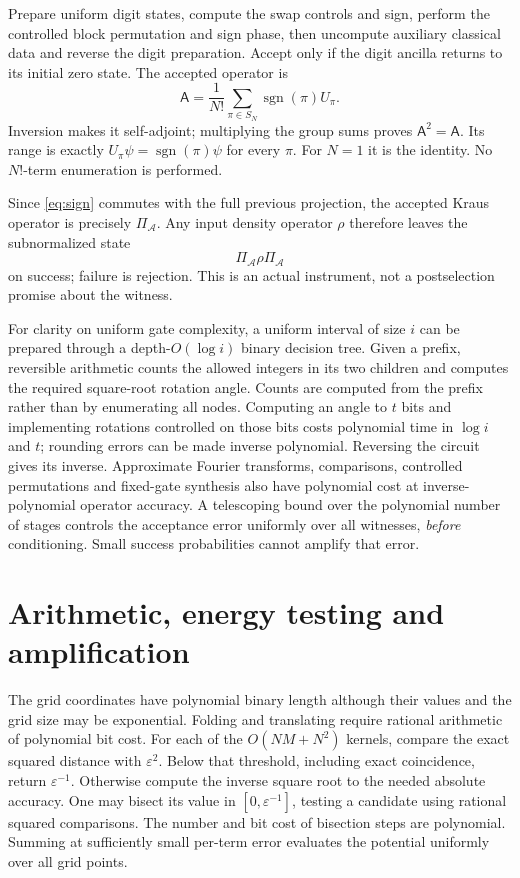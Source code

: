 \documentclass[11pt]{article}
\theoremstyle{remark}\newtheorem{remark}[theorem]{Remark}
\numberwithin{equation}{section}
\begin{document}
Prepare uniform digit states, compute the swap controls and sign, perform
the controlled block permutation and sign phase, then uncompute auxiliary
classical data and reverse the digit preparation. Accept only if the digit
ancilla returns to its initial zero state. The accepted operator is
\begin{equation}\label{eq:sign}
 \mathsf A=\frac1{N!}\sum_{\pi\in S_N}\operatorname{sgn}(\pi)U_\pi.
\end{equation}
Inversion makes it self-adjoint; multiplying the group sums proves
$\mathsf A^2=\mathsf A$. Its range is exactly
$U_\pi\psi=\operatorname{sgn}(\pi)\psi$ for every $\pi$.
For $N=1$ it is the identity. No $N!$-term enumeration is performed.

Since \eqref{eq:sign} commutes with the full previous projection, the
accepted Kraus operator is precisely $\Pi_{\mathcal A}$. Any input density
operator $\rho$ therefore leaves the subnormalized state
\begin{equation}\label{eq:subnorm}
 \Pi_{\mathcal A}\rho\Pi_{\mathcal A}
\end{equation}
on success; failure is rejection. This is an actual instrument, not a
postselection promise about the witness.

For clarity on uniform gate complexity, a uniform interval of size $i$
can be prepared through a depth-$O(\log i)$ binary decision tree. Given a
prefix, reversible arithmetic counts the allowed integers in its two
children and computes the required square-root rotation angle. Counts are
computed from the prefix rather than by enumerating all nodes. Computing
an angle to $t$ bits and implementing rotations controlled on those bits
costs polynomial time in $\log i$ and $t$; rounding errors can be made
inverse polynomial. Reversing the circuit gives its inverse.
Approximate Fourier transforms, comparisons, controlled permutations and
fixed-gate synthesis also have polynomial cost at inverse-polynomial
operator accuracy. A telescoping bound over the polynomial number of
stages controls the acceptance error uniformly over all witnesses,
\emph{before} conditioning. Small success probabilities cannot amplify
that error.

\section{Arithmetic, energy testing and amplification}
\label{sec:verification}
The grid coordinates have polynomial binary length although their values
and the grid size may be exponential. Folding and translating require
rational arithmetic of polynomial bit cost. For each of the
$O(NM+N^2)$ kernels, compare the exact squared distance with
$\varepsilon^2$. Below that threshold, including exact coincidence, return
$\varepsilon^{-1}$. Otherwise compute the inverse square root to the
needed absolute accuracy. One may bisect its value in
$[0,\varepsilon^{-1}]$, testing a candidate using rational squared
comparisons. The number and bit cost of bisection steps are polynomial.
Summing at sufficiently small per-term error evaluates the potential
uniformly over all grid points.
\end{document}
